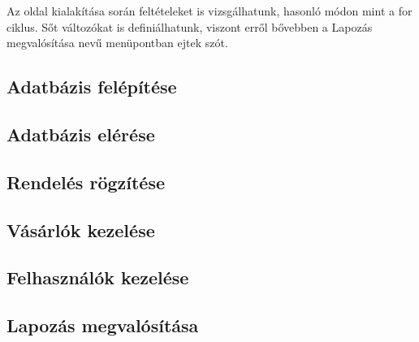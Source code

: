 Az oldal kialakítása során feltételeket is vizsgálhatunk, hasonló módon mint a for ciklus. Sőt változókat is definiálhatunk, viszont erről bővebben a Lapozás megvalósítása nevű menüpontban ejtek szót.
\subsection{Adatbázis felépítése}
\subsection{Adatbázis elérése}
\subsection{Rendelés rögzítése}
\subsection{Vásárlók kezelése}
\subsection{Felhasználók kezelése}
\subsection{Lapozás megvalósítása}
